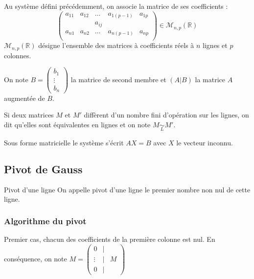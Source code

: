 \begin{defi}{}
Au système défini précédemment, on associe la matrice de ses coefficients :
$$
\begin{pmatrix}
a_{11} & a_{12} & \ldots & a_{1(p-1)} & a_{1p} \\
 & & a_{ij} & & \\
a_{n1} & a_{n2} & \ldots & a_{n(p-1)} & a_{np} \\
\end{pmatrix} \in \mathcal{M}_{n,p}(\mathbb{R})
$$
$\mathcal{M}_{n,p}(\mathbb{R})$ désigne l'ensemble des matrices à coefficients réels à $n$ lignes et $p$ colonnes. 
\end{defi}

\begin{defi}{}
On note $B=\begin{pmatrix} b_1 \\ \vdots \\ b_n \end{pmatrix}$ la matrice de second membre et $(A|B)$ la matrice $A$ augmentée de $B$. 
\end{defi}


\begin{defi}{}
Si deux matrices $M$ et $M'$ diffèrent d'un nombre fini d'opération sur les lignes, on dit qu'elles sont équivalentes en lignes et on note $M \underset{L}{\sim} M'$. 
\end{defi}

\begin{rem}
Sous forme matricielle le système s'écrit $AX=B$ avec $X$ le vecteur inconnu. 
\end{rem}


\subsection{Pivot de Gauss}
\begin{defi}{Pivot d'une ligne}
On appelle pivot d'une ligne le premier nombre non nul de cette ligne. 
\end{defi}

\subsubsection{Algorithme du pivot}
Premier cas, chacun des coefficients de la première colonne est nul. En conséquence, on note 
$M = \begin{pmatrix} 0 & | &  \\ \vdots & | & M \\ 0 & | &  \end{pmatrix}$ 

